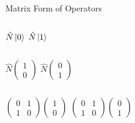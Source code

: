 \documentclass{beamer}
\begin{document}
\begin{frame}{Matrix Form of Operators}
    \begin{columns}
        \centering
        \begin{math}
            \hat{N}\ket{0}
        \end{math}\vfill
        \centering
        \begin{math}
            \hat{N}\ket{1}
        \end{math}
    \end{columns}\vfill
    \pause
    \begin{columns}
        \centering
        \begin{math}
            \hat{N}
            \begin{pmatrix}
                1 \\ 0
            \end{pmatrix}
        \end{math}
        \centering
        \begin{math}
            \hat{N}
            \begin{pmatrix}
                0 \\ 1
            \end{pmatrix}
        \end{math}
    \end{columns}\vfill
    \pause
    \begin{columns}
        \centering
        \begin{math}
            \begin{pmatrix}
                0 & 1 \\ 1 & 0
            \end{pmatrix}
            \begin{pmatrix}
                1 \\ 0
            \end{pmatrix}
        \end{math}
        \centering
        \begin{math}
            \begin{pmatrix}
                0 & 1 \\ 1 & 0
            \end{pmatrix}
            \begin{pmatrix}
                0 \\ 1

\end{pmatrix}
\end{math}
\end{columns}
\end{frame}
\end{document}
